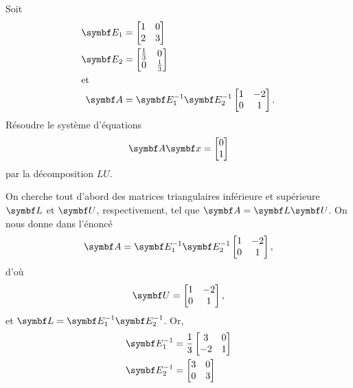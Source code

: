 \begin{exercice}
  Soit
  \begin{align*}
    \mat{E}_1
    &= \begin{bmatrix} 1&0 \\ 2&3 \end{bmatrix} \\
    \mat{E}_2
    &= \begin{bmatrix} \frac{1}{3}&0 \\ 0&\frac{1}{3} \end{bmatrix} \\
    \intertext{et}
    \mat{A}
    &= \mat{E}_1^{-1} \mat{E}_2^{-1}
    \begin{bmatrix} 1&-2 \\ 0&1 \end{bmatrix}.
  \end{align*}
  Résoudre le système d'équations
  \begin{displaymath}
    \mat{A} \mat{x} = \begin{bmatrix} 0\\1 \end{bmatrix}
  \end{displaymath}
  par la décomposition $LU$.
  \begin{sol}
    On cherche tout d'abord des matrices triangulaires inférieure et
    supérieure $\mat{L}$ et $\mat{U}$, respectivement, tel que
    $\mat{A} = \mat{L} \mat{U}$. On nous donne dans l'énoncé
    \begin{displaymath}
      \mat{A} = \mat{E}_1^{-1} \mat{E}_2^{-1}
      \begin{bmatrix} 1&-2 \\ 0&1 \end{bmatrix},
    \end{displaymath}
    d'où
    \begin{displaymath}
      \mat{U} = \begin{bmatrix} 1&-2 \\ 0&1 \end{bmatrix},
    \end{displaymath}
    et $\mat{L} = \mat{E}_1^{-1} \mat{E}_2^{-1}$. Or,
    \begin{align*}
      \mat{E}_1^{-1}
      &= \frac{1}{3} \begin{bmatrix} 3&0 \\ -2&1 \end{bmatrix} \\
      \mat{E}_2^{-1}
      &= \begin{bmatrix} 3&0 \\ 0&3 \end{bmatrix} \\

\end{align*}
\end{sol}
\end{exercice}
